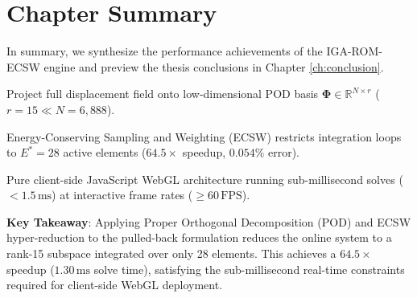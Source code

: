 \section{Chapter Summary}

In summary, we synthesize the performance achievements of the IGA-ROM-ECSW engine and preview the thesis conclusions in Chapter \ref{ch:conclusion}.

\begin{tcolorbox}[colback=lightbg, colframe=primaryblue, title=\textbf{Chapter Summary: Real-Time ROM \& Hyper-Reduction}, fonttitle=\bfseries]
    \begin{description}[leftmargin=!, labelwidth=3.4cm]
        \item[\textbf{Core Strategy}] Project full displacement field onto low-dimensional POD basis $\boldsymbol{\Phi} \in \mathbb{R}^{N \times r}$ ($r = 15 \ll N = 6,888$).
        \item[\textbf{Hyper-Reduction}] Energy-Conserving Sampling and Weighting (ECSW) restricts integration loops to $E^* = 28$ active elements ($64.5\times$ speedup, $0.054\%$ error).
        \item[\textbf{Application}] Pure client-side JavaScript WebGL architecture running sub-millisecond solves ($<1.5\,\text{ms}$) at interactive frame rates ($\ge 60\,\text{FPS}$).
    \end{description}
    
    \vspace{0.2cm}
    \textbf{Key Takeaway}: Applying Proper Orthogonal Decomposition (POD) and ECSW hyper-reduction to the pulled-back formulation reduces the online system to a rank-15 subspace integrated over only 28 elements. This achieves a $64.5\times$ speedup ($1.30\,\text{ms}$ solve time), satisfying the sub-millisecond real-time constraints required for client-side WebGL deployment.
\end{tcolorbox}
